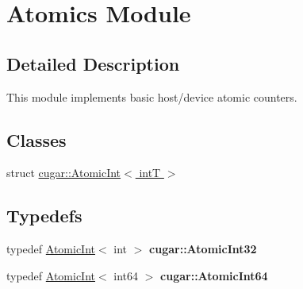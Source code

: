 \hypertarget{group___atomics}{}\section{Atomics Module}
\label{group___atomics}


\subsection{Detailed Description}
This module implements basic host/device atomic counters. \subsection*{Classes}
\begin{DoxyCompactItemize}
\item 
struct \hyperlink{structcugar_1_1_atomic_int}{cugar\+::\+Atomic\+Int$<$ int\+T $>$}
\end{DoxyCompactItemize}
\subsection*{Typedefs}
\begin{DoxyCompactItemize}
\item 
\mbox{\label{group___atomics_gada49a12d52883f36cca112defd30e80c}} 
typedef \hyperlink{structcugar_1_1_atomic_int}{Atomic\+Int}$<$ int $>$ {\bfseries cugar\+::\+Atomic\+Int32}
\item 
\mbox{\label{group___atomics_gae8a4647d6ea3fdf84a9d2faff1ae5102}} 
typedef \hyperlink{structcugar_1_1_atomic_int}{Atomic\+Int}$<$ int64 $>$ {\bfseries cugar\+::\+Atomic\+Int64}
\end{DoxyCompactItemize}
